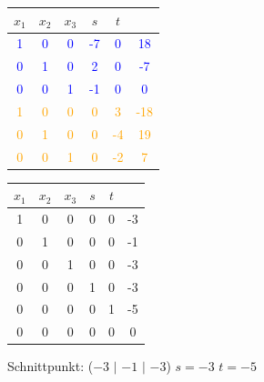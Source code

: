 		\vspace{0.2cm}
		
		\begin{minipage}[b]{.5\linewidth} 
  		\begin{tabular}{| c c c c c | c |}
		\hline
		$x_1$ & $x_2$ & $x_3$ & $s$ & $t$ & \\
		\hline
		\textcolor{blue}1 & \textcolor{blue}0 & \textcolor{blue}0 & \textcolor{blue}{-7} & \textcolor{blue}0 & \textcolor{blue}{18} \\
		\textcolor{blue}0 & \textcolor{blue}1 & \textcolor{blue}0 & \textcolor{blue}2 & \textcolor{blue}0 & \textcolor{blue}{-7} \\
		\textcolor{blue}0 & \textcolor{blue}0 & \textcolor{blue}1 & \textcolor{blue}{-1} & \textcolor{blue}0 & \textcolor{blue}0 \\
		\textcolor{orange}1 & \textcolor{orange}0 & \textcolor{orange}0 & \textcolor{orange}0 & \textcolor{orange}3 & \textcolor{orange}{-18} \\
		\textcolor{orange}0 & \textcolor{orange}1 & \textcolor{orange}0 & \textcolor{orange}0 & \textcolor{orange}{-4} & \textcolor{orange}{19} \\
		\textcolor{orange}0 & \textcolor{orange}0 & \textcolor{orange}1 & \textcolor{orange}0 & \textcolor{orange}{-2} & \textcolor{orange}7 \\
	    \hline
		\end{tabular}		
  		\end{minipage}
		\hfill
		\begin{minipage}[b]{.45\linewidth} 
  		\begin{tabular}{| c c c c c | c |}
		\hline
		$x_1$ & $x_2$ & $x_3$ & $s$ & $t$ & \\
		\hline
		1 & 0 & 0 & 0 & 0 & -3 \\
		0 & 1 & 0 & 0 & 0 & -1 \\
		0 & 0 & 1 & 0 & 0 & -3 \\
		0 & 0 & 0 & 1 & 0 & -3 \\
		0 & 0 & 0 & 0 & 1 & -5 \\
		0 & 0 & 0 & 0 & 0 & 0 \\
	    \hline
		\end{tabular}		
		\end{minipage}		
		
		\vspace{0.2cm}
		
		Schnittpunkt: ($-3$ $\vert$ $-1$ $\vert$ $-3$) \quad $s = -3$ \quad $t = -5$	
		
		
		
